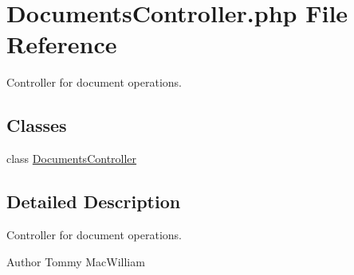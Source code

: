 \hypertarget{DocumentsController_8php}{
\section{\-Documents\-Controller.php \-File \-Reference}
\label{DocumentsController_8php}
}


\-Controller for document operations.  


\subsection*{\-Classes}
\begin{DoxyCompactItemize}
\item 
class \hyperlink{classDocumentsController}{\-Documents\-Controller}
\end{DoxyCompactItemize}


\subsection{\-Detailed \-Description}
\-Controller for document operations. \begin{DoxyAuthor}{\-Author}
\-Tommy \-Mac\-William 
\end{DoxyAuthor}
